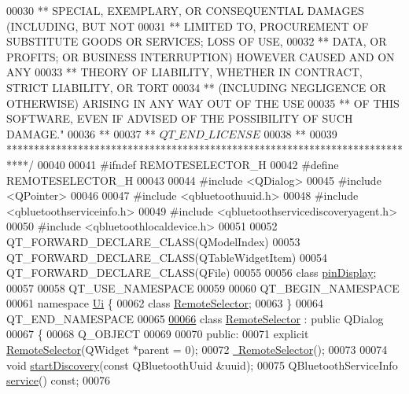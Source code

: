 \begin{DoxyCode}
00030 \textcolor{comment}{** SPECIAL, EXEMPLARY, OR CONSEQUENTIAL DAMAGES (INCLUDING, BUT NOT}
00031 \textcolor{comment}{** LIMITED TO, PROCUREMENT OF SUBSTITUTE GOODS OR SERVICES; LOSS OF USE,}
00032 \textcolor{comment}{** DATA, OR PROFITS; OR BUSINESS INTERRUPTION) HOWEVER CAUSED AND ON ANY}
00033 \textcolor{comment}{** THEORY OF LIABILITY, WHETHER IN CONTRACT, STRICT LIABILITY, OR TORT}
00034 \textcolor{comment}{** (INCLUDING NEGLIGENCE OR OTHERWISE) ARISING IN ANY WAY OUT OF THE USE}
00035 \textcolor{comment}{** OF THIS SOFTWARE, EVEN IF ADVISED OF THE POSSIBILITY OF SUCH DAMAGE."}
00036 \textcolor{comment}{**}
00037 \textcolor{comment}{** $QT\_END\_LICENSE$}
00038 \textcolor{comment}{**}
00039 \textcolor{comment}{****************************************************************************/}
00040 
00041 \textcolor{preprocessor}{#ifndef REMOTESELECTOR\_H}
00042 \textcolor{preprocessor}{#define REMOTESELECTOR\_H}
00043 
00044 \textcolor{preprocessor}{#include <QDialog>}
00045 \textcolor{preprocessor}{#include <QPointer>}
00046 
00047 \textcolor{preprocessor}{#include <qbluetoothuuid.h>}
00048 \textcolor{preprocessor}{#include <qbluetoothserviceinfo.h>}
00049 \textcolor{preprocessor}{#include <qbluetoothservicediscoveryagent.h>}
00050 \textcolor{preprocessor}{#include <qbluetoothlocaldevice.h>}
00051 
00052 QT\_FORWARD\_DECLARE\_CLASS(QModelIndex)
00053 QT\_FORWARD\_DECLARE\_CLASS(QTableWidgetItem)
00054 QT\_FORWARD\_DECLARE\_CLASS(QFile)
00055 
00056 class \hyperlink{classpinDisplay}{pinDisplay};
00057 
00058 QT\_USE\_NAMESPACE
00059 
00060 QT\_BEGIN\_NAMESPACE
00061 namespace \hyperlink{namespaceUi}{Ui} \{
00062     \textcolor{keyword}{class }\hyperlink{classRemoteSelector}{RemoteSelector};
00063 \}
00064 QT\_END\_NAMESPACE
00065 
\hypertarget{remoteselector_8h_source.tex_l00066}{}\hyperlink{classRemoteSelector}{00066} \textcolor{keyword}{class }\hyperlink{classRemoteSelector}{RemoteSelector} : \textcolor{keyword}{public} QDialog
00067 \{
00068     Q\_OBJECT
00069 
00070 \textcolor{keyword}{public}:
00071     \textcolor{keyword}{explicit} \hyperlink{classRemoteSelector_afd501861aba4f67aee79d24c40c9944c}{RemoteSelector}(QWidget *parent = 0);
00072     \hyperlink{classRemoteSelector_afa7b3a154952183e183d06c0a01f9c84}{~RemoteSelector}();
00073 
00074     \textcolor{keywordtype}{void} \hyperlink{classRemoteSelector_a63cf76514fa5b2bf1b85b87db1a49e99}{startDiscovery}(\textcolor{keyword}{const} QBluetoothUuid &uuid);
00075     QBluetoothServiceInfo \hyperlink{classRemoteSelector_ada5543d127d62eb91591d4d11294b8b2}{service}() \textcolor{keyword}{const};
00076 

\end{DoxyCode}
